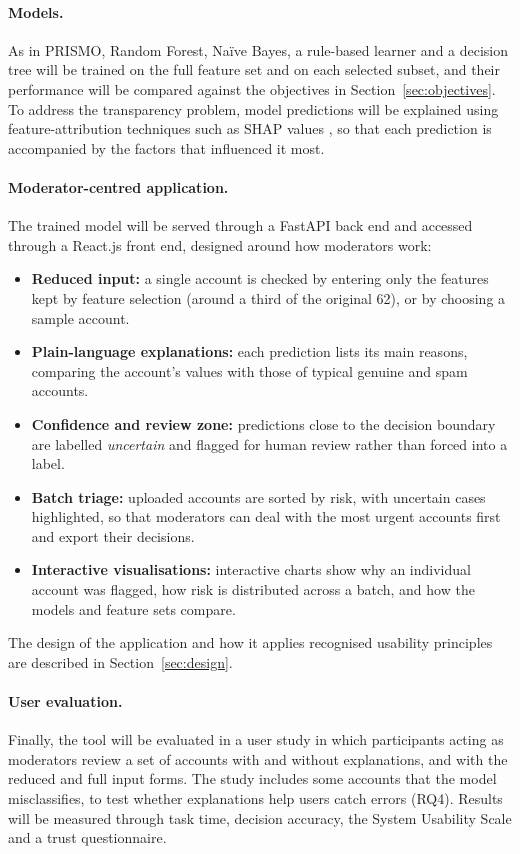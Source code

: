 \paragraph{Models.} As in PRISMO, Random Forest, Na\"ive Bayes, a rule-based learner and a decision tree will be trained on the full feature set and on each selected subset, and their performance will be compared against the objectives in Section~\ref{sec:objectives}. To address the transparency problem, model predictions will be explained using feature-attribution techniques such as SHAP values \parencite{lundberg2017unified}, so that each prediction is accompanied by the factors that influenced it most.

\paragraph{Moderator-centred application.} The trained model will be served through a FastAPI back end and accessed through a React.js front end, designed around how moderators work:

\begin{itemize}[nosep]
  \item \textbf{Reduced input:} a single account is checked by entering only the features kept by feature selection (around a third of the original 62), or by choosing a sample account.
  \item \textbf{Plain-language explanations:} each prediction lists its main reasons, comparing the account's values with those of typical genuine and spam accounts.
  \item \textbf{Confidence and review zone:} predictions close to the decision boundary are labelled \emph{uncertain} and flagged for human review rather than forced into a label.
  \item \textbf{Batch triage:} uploaded accounts are sorted by risk, with uncertain cases highlighted, so that moderators can deal with the most urgent accounts first and export their decisions.
  \item \textbf{Interactive visualisations:} interactive charts show why an individual account was flagged, how risk is distributed across a batch, and how the models and feature sets compare.
\end{itemize}

The design of the application and how it applies recognised usability principles are described in Section~\ref{sec:design}.

\paragraph{User evaluation.} Finally, the tool will be evaluated in a user study in which participants acting as moderators review a set of accounts with and without explanations, and with the reduced and full input forms. The study includes some accounts that the model misclassifies, to test whether explanations help users catch errors (RQ4). Results will be measured through task time, decision accuracy, the System Usability Scale \parencite{brooke1996sus} and a trust questionnaire.
